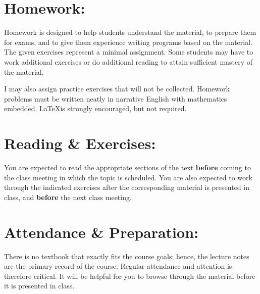 \documentclass[margin]{res}
\theoremstyle{plain}
\theoremstyle{definition}
\theoremstyle{remark}
\begin{document}
\begin{resume}

\section{Homework:}
Homework is designed to help students understand the material, to prepare them for exams, and to give them experience writing programs based on the material.   The given exercises represent a minimal assignment. Some students may have to work additional exercises or do additional reading to attain sufficient mastery of the material. 

I may also assign practice exercises that will not be collected. Homework                                                                                                                                                                                                        problems must be written neatly in narrative English with mathematics embedded.  \LaTeX is strongly encouraged, but not required. %

\section{Reading \& Exercises:} You are expected to read the appropriate sections of the text \textbf{before} coming to the class meeting in which the topic is scheduled. You are also expected to work through the indicated exercises after the corresponding  material is presented in class, and \textbf{before} the next class meeting.

\section{Attendance \& Preparation:} 
There is no textbook that exactly fits the course goals; hence, the lecture notes are the primary record of the course. Regular attendance and attention is therefore critical. It will be helpful for you to browse through the material before it is presented in class.


\end{resume}
\end{document}
